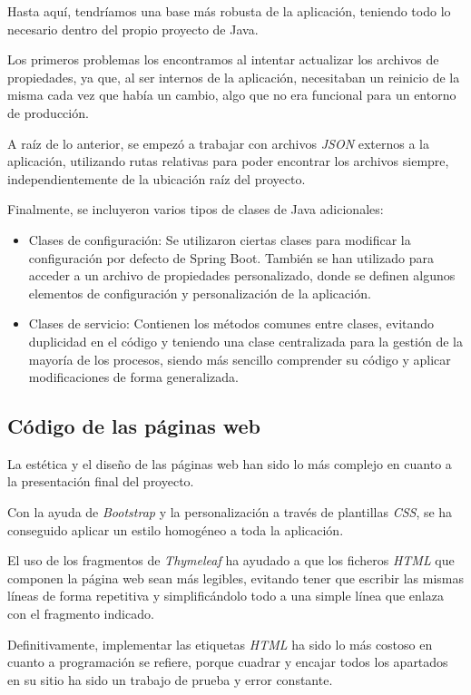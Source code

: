 Hasta aquí, tendríamos una base más robusta de la aplicación, teniendo todo lo necesario dentro del propio proyecto de Java.

Los primeros problemas los encontramos al intentar actualizar los archivos de propiedades, ya que, al ser internos de la aplicación, necesitaban un reinicio de la misma cada vez que había un cambio, algo que no era funcional para un entorno de producción.

A raíz de lo anterior, se empezó a trabajar con archivos \textit{JSON} externos a la aplicación, utilizando rutas relativas para poder encontrar los archivos siempre, independientemente de la ubicación raíz del proyecto.

Finalmente, se incluyeron varios tipos de clases de Java adicionales:

 \begin{itemize}
	\item Clases de configuración: Se utilizaron ciertas clases para modificar la configuración por defecto de Spring Boot. También se han utilizado para acceder a un archivo de propiedades personalizado, donde se definen algunos elementos de configuración y personalización de la aplicación.
	\item Clases de servicio: Contienen los métodos comunes entre clases, evitando duplicidad en el código y teniendo una clase centralizada para la gestión de la mayoría de los procesos, siendo más sencillo comprender su código y aplicar modificaciones de forma generalizada.
\end{itemize}

\subsection{Código de las páginas web}

La estética y el diseño de las páginas web han sido lo más complejo en cuanto a la presentación final del proyecto.

Con la ayuda de \textit{Bootstrap} y la personalización a través de plantillas \textit{CSS}, se ha conseguido aplicar un estilo homogéneo a toda la aplicación.

El uso de los fragmentos de \textit{Thymeleaf} ha ayudado a que los ficheros \textit{HTML} que componen la página web sean más legibles, evitando tener que escribir las mismas líneas de forma repetitiva y simplificándolo todo a una simple línea que enlaza con el fragmento indicado.

Definitivamente, implementar las etiquetas \textit{HTML} ha sido lo más costoso en cuanto a programación se refiere, porque cuadrar y encajar todos los apartados en su sitio ha sido un trabajo de prueba y error constante.

